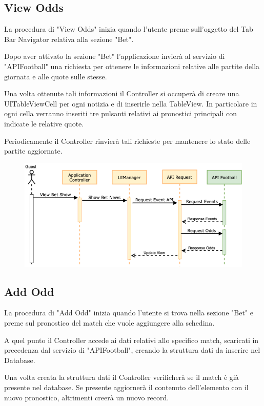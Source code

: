 \documentclass[numbers=noenddot, 12pt, a4paper, oneside]{scrbook}
\begin{document}
\newpage
\subsection*{View Odds}
La procedura di "View Odds" inizia quando l'utente preme sull'oggetto del Tab Bar Navigator relativa alla sezione "Bet".

Dopo aver attivato la sezione "Bet" l'applicazione invierà al servizio di "APIFootball" una richiesta per ottenere le informazioni relative alle partite della giornata e alle quote sulle stesse.

Una volta ottenute tali informazioni il Controller si occuperà di creare una UITableViewCell per ogni notizia e di inserirle nella TableView. In particolare in ogni cella verranno inseriti tre pulsanti relativi ai pronostici principali con indicate le relative quote.

Periodicamente il Controller rinvierà tali richieste per mantenere lo stato delle partite aggiornate.
\begin{figure}[H]
	\centering
	\includegraphics[width=1\textwidth]{images/Sequence/SequenceOdds}
\end{figure}

\newpage
\subsection*{Add Odd}
La procedura di "Add Odd" inizia quando l'utente si trova nella sezione "Bet" e preme sul pronostico del match che vuole aggiungere alla schedina.

A quel punto il Controller accede ai dati relativi allo specifico match, scaricati in precedenza dal servizio di "APIFootball", creando la struttura dati da inserire nel Database.

Una volta creata la struttura dati il Controller verificherà se il match è già presente nel database. Se presente aggiornerà il contenuto dell'elemento con il nuovo pronostico, altrimenti creerà un nuovo record.
\end{document}
